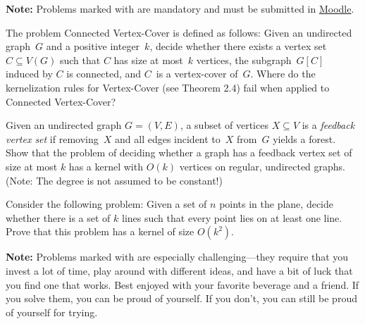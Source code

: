 \documentclass[english]{uebung_cs}
\begin{document}
\textbf{Note:} Problems marked with \mandatory are mandatory and must be submitted in \href{https://moodle.studiumdigitale.uni-frankfurt.de/moodle/course/view.php?id=6259}{Moodle}.

\begin{exercise}
  \label{ex:CVC}
  The problem Connected Vertex-Cover is defined as follows: Given an undirected graph~$G$ and a positive integer~$k$, decide whether there exists a vertex set $C\subseteq V(G)$ such that $C$ has size at most~$k$ vertices, the subgraph~$G[C]$ induced by $C$ is connected, and $C$~is a vertex-cover of~$G$.
  Where do the kernelization rules for Vertex-Cover (see Theorem 2.4) fail when applied to Connected Vertex-Cover?
\end{exercise}

\begin{exercise}
  Given an undirected graph $G = (V, E)$, a subset of vertices $X \subseteq V$ is a \emph{feedback vertex
  set} if removing~$X$ and all edges incident to~$X$ from~$G$ yields a forest. Show that the problem of deciding
  whether a graph has a feedback vertex set of size at most $k$ has a kernel with $O(k)$ vertices on regular,
  undirected graphs. (Note: The degree is not assumed to be constant!)
\end{exercise}

\begin{exercise}
  Consider the following problem: Given a set of $n$ points in the plane, decide whether
  there is a set of $k$ lines such that every point lies on at least one line. Prove that this problem has a
  kernel of size $O(k^2)$.
\end{exercise}%

\textbf{Note:} Problems marked with \hard are especially challenging---they require that you invest a lot of time, play around with different ideas, and have a bit of luck that you find one that works. Best enjoyed with your favorite beverage and a friend. If you solve them, you can be proud of yourself. If you don't, you can still be proud of yourself for trying.
\end{document}
